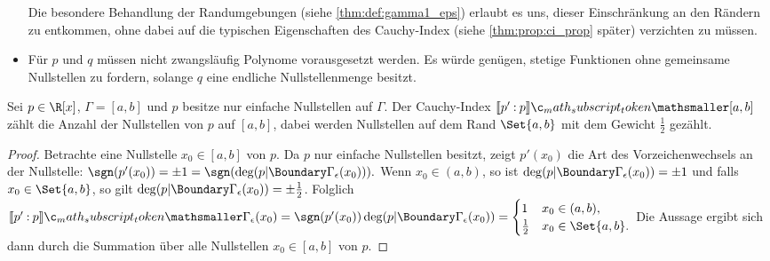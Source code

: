 \documentclass{mythesis}
\begin{document}
\begin{definition}
\begin{note}
\begin{itemize}
                Die besondere Behandlung der Randumgebungen (siehe \ref{thm:def:gamma1_eps}) erlaubt es uns, dieser Einschränkung an den Rändern zu entkommen, ohne dabei auf die typischen Eigenschaften des Cauchy-Index (siehe \ref{thm:prop:ci_prop} später) verzichten zu müssen.
            \item
                Für $p$ und $q$ müssen nicht zwangsläufig Polynome vorausgesetzt werden.
                Es würde genügen, stetige Funktionen ohne gemeinsame Nullstellen zu fordern, solange $q$ eine endliche Nullstellenmenge besitzt.
        \end{itemize}
    \end{note}
\end{definition}


\begin{example} \label{thm:ex:ci_roots}
    Sei $p \in \R[x]$, $\Gamma = [a,b]$ und $p$ besitze nur einfache Nullstellen auf $\Gamma$.
    Der Cauchy-Index $\Index{[a,b]}{p'}{p}$ zählt die Anzahl der Nullstellen von $p$ auf $[a,b]$, dabei werden Nullstellen auf dem Rand $\Set{a,b}$ mit dem Gewicht $\frac{1}{2}$ gezählt.
    \begin{proof}
        Betrachte eine Nullstelle $x_0 \in [a,b]$ von $p$.
        Da $p$ nur einfache Nullstellen besitzt, zeigt $p'(x_0)$ die Art des Vorzeichenwechsels an der Nullstelle:
        \begin{math}
            \sgn(p'(x_0)) = \pm 1 = \sgn(\deg(p|\Boundary\Gamma_\epsilon(x_0))).
        \end{math}
        Wenn $x_0 \in (a,b)$, so ist $\deg(p|\Boundary\Gamma_\epsilon(x_0)) = \pm 1$ und falls $x_0 \in \Set{a,b}$, so gilt $\deg(p|\Boundary\Gamma_\epsilon(x_0)) = \pm \frac{1}{2}$.
        Folglich
        \begin{math}
            \Index{\Gamma_\epsilon(x_0)}{p'}{p}
            = \sgn(p'(x_0)) \deg(p|\Boundary\Gamma_\epsilon(x_0)) = \begin{cases}
                1 & x_0 \in (a,b), \\
                \frac{1}{2} & x_0 \in \Set{a,b}.
            \end{cases}
        \end{math}
        Die Aussage ergibt sich dann durch die Summation über alle Nullstellen $x_0 \in [a,b]$ von $p$.
    \end{proof}
\end{example}
\end{document}
